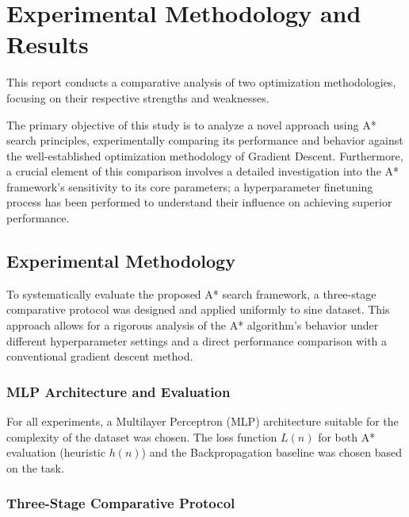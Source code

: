 \chapter{Experimental Methodology and Results}
\label{chap:results}

This report conducts a comparative analysis of two optimization methodologies, focusing on their respective strengths and weaknesses. 

The primary objective of this study is to analyze a novel approach using A* search principles, experimentally comparing its performance and behavior against the well-established optimization methodology of Gradient Descent. Furthermore, a crucial element of this comparison involves a detailed investigation into the A* framework's sensitivity to its core parameters; a hyperparameter finetuning process has been performed to understand their influence on achieving superior performance.

\section{Experimental Methodology}
\label{sec:experimental_methodology}

To systematically evaluate the proposed A* search framework, a three-stage comparative protocol was designed and applied uniformly to sine dataset. This approach allows for a rigorous analysis of the A* algorithm's behavior under different hyperparameter settings and a direct performance comparison with a conventional gradient descent method.

\subsection{MLP Architecture and Evaluation}
For all experiments, a Multilayer Perceptron (MLP) architecture suitable for the complexity of the dataset was chosen. The loss function $L(n)$ for both A* evaluation (heuristic $h(n)$) and the Backpropagation baseline was chosen based on the task.

\subsection{Three-Stage Comparative Protocol}


